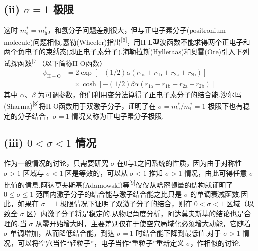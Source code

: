\subsection*{(ii) $\sigma=1$ 极限}

这时 $m_{\mathrm{e}}^{*}=m_{\mathrm{h}}^{*}$，和氢分子问题差别很大，但与正电子素分子(positronium molecule)问题相似.惠勒(Wheeler)指出\textsuperscript{[6]}，用H-L型波函数不能求得两个正电子和两个负电子的束缚态(即正电子素分子).海勒拉斯(Hylleraas)和奥雷(Ore)引入下列试探函数\textsuperscript{[7]}（以下简称H-O函数）
\begin{equation}
\begin{aligned}
  \psi_{\mathrm{H}-\mathrm{O}}&=2\exp\left[-(1/2)\alpha
  \left(r_{1\mathrm{a}}+r_{1\mathrm{b}}+r_{2\mathrm{a}}+r_{2\mathrm{b}}\right)\right]\\
  &\quad\times\cosh\left[-(1/2)\beta\alpha
  \left(r_{1\mathrm{a}}-r_{1\mathrm{b}}-r_{2\mathrm{a}}+r_{2\mathrm{b}}\right)\right]
\end{aligned}
\end{equation}
其中 $\alpha$、$\beta$ 为可调参数，他们利用变分法算得了正电子素分子的结合能.沙尔玛(Sharma)\textsuperscript{[8]}将H-O函数用于双激子分子，证明了在 $\sigma=m_{\mathrm{e}}^{*}/m_{\mathrm{h}}^{*}=1$ 极限下也有稳定的分子结合，$\sigma=1$ 情况又称为正电子素分子极限.

\subsection*{(iii) $0<\sigma<1$ 情况}

作为一般情况的讨论，只需要研究 $\sigma$ 在0与1之间系统的性质，因为由于对称性 $\sigma>1$ 区域与 $\sigma<1$ 区是等效的，可以从 $\sigma<1$ 推知 $\sigma>1$ 情况，由此可得任意 $\sigma$ 比值的信息.阿达莫夫斯基(Adamowski)等\textsuperscript{[9]}仅仅从哈密顿量的结构就证明了 $0\leqslant\sigma\leqslant1$ 范围内激子分子的结合能与激子结合能之比只是 $\sigma$ 的单调衰减函数.因此，如果在 $\sigma=1$ 极限情况下证明了双激子分子的结合，则在 $0<\sigma<1$ 区域（以致全 $\sigma$ 区）内激子分子将是稳定的.从物理角度分析，阿达莫夫斯基的结论也是合理的.当 $\sigma$ 从零开始增大时，主要差别仅在于使空穴局域化必须增大动能，它随着 $\sigma$ 单调增加，从而降低结合能，到达 $\sigma=1$ 时结合能下降到最低值.对于 $\sigma>1$ 情况，可以将空穴当作“轻粒子”，电子当作“重粒子”重新定义 $\sigma$，作相似的讨论.

